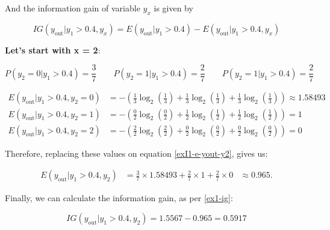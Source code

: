 \documentclass[12pt]{article}
\begin{document}
\begin{enumerate}[leftmargin=\labelsep]
        And the information gain of variable $y_x$ is given by

        \begin{equation}\label{ex1-ig}
          IG(y_{\text{out}} |y_1 > 0.4, y_x) = E(y_{\text{out}} |y_1 > 0.4) - E(y_{\text{out}} |y_1 > 0.4, y_x)
        \end{equation}

        \textbf{Let's start with x = 2}:

        \begin{equation*}
          P(y_2 = 0| y_1 > 0.4) = \frac{3}{7} \qquad
          P(y_2 = 1| y_1 > 0.4) = \frac{2}{7} \qquad
          P(y_2 = 1| y_1 > 0.4) = \frac{2}{7}
        \end{equation*}

        \[
          \begin{aligned}
            E(y_{\text{out}} | y_1 > 0.4 , y_2 = 0) & = - \left(\frac{1}{3} \log_2\left(\frac{1}{3}\right) + \frac{1}{3} \log_2\left(\frac{1}{3}\right)
            + \frac{1}{3} \log_2\left(\frac{1}{3}\right)\right) \approx 1.58493                                                                         \\
            E(y_{\text{out}} | y_1 > 0.4 , y_2 = 1) & = - \left(\frac{0}{2} \log_2\left(\frac{0}{2}\right) + \frac{1}{2} \log_2\left(\frac{1}{2}\right)
            + \frac{1}{2} \log_2\left(\frac{1}{2}\right)\right) = 1                                                                                     \\
            E(y_{\text{out}} | y_1 > 0.4 , y_2 = 2) & = - \left(\frac{2}{2} \log_2\left(\frac{2}{2}\right) + \frac{0}{2} \log_2\left(\frac{0}{2}\right)
            + \frac{0}{2} \log_2\left(\frac{0}{2}\right)\right) = 0
          \end{aligned}
        \]

        Therefore, replacing these values on equation \eqref{exI1-e-yout-y2}, gives us:

        \[
          \begin{aligned}
            E(y_{\text{out}} | y_1>0.4, y_2) & = \frac{3}{7} \times 1.58493 + \frac{2}{7} \times 1 + \frac{2}{7} \times 0 & \approx 0.965.
          \end{aligned}
        \]

        Finally, we can calculate the information gain, as per \eqref{ex1-ig}:

        \[
          IG(y_{\text{out}} |y_1 > 0.4, y_2) = 1.5567 - 0.965 = 0.5917
        \]


\end{enumerate}
\end{document}
